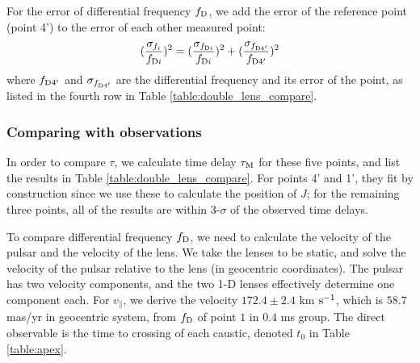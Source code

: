 \documentclass[useAMS,usenatbib]{mn2e}
\begin{document}
For the error of differential frequency $f_{\rm D}$, we add the error of the reference point (point 4') to the error of each other measured point:
\begin{equation}
\begin{aligned}
(\frac{\sigma_{f_i}}{f_{{\rm D}i}})^2=(\frac{\sigma_{f_{{\rm D}i}}}{f_{{\rm D}i}})^2+(\frac{\sigma_{f_{{\rm D}4'}}}{f_{{\rm D}4'}})^2
\end{aligned}
\end{equation}
where $f_{{\rm D}4'}$ and $\sigma_{f_{{\rm D}4'}}$ are the differential frequency
and its error of the point, as listed in the fourth row in Table
\ref{table:double_lens_compare}.

\subsubsection{Comparing with observations}
In order to compare $\tau$, we calculate time delay $\tau_{\rm M}$ for these five
points, and list the results in Table
\ref{table:double_lens_compare}. For points 4' and 1', they fit by
construction since we use these to calculate the position of $J$; for the remaining three points, all of the results are within 3-$\sigma$ of the observed time delays.

To compare differential frequency $f_{\rm D}$, we need to calculate the velocity of the pulsar and the velocity of the lens. We take the lenses to be static, and solve the velocity of the pulsar relative to the lens (in geocentric coordinates). The pulsar has two velocity components, and the two 1-D lenses effectively determine one component each.
For $v_{\parallel}$, we derive the velocity $172.4 \pm 2.4$ km $\rm s^{-1}$, 
which is $58.7$ mas/yr in geocentric system, 
from $f_{\rm D}$ of point $1$ in $0.4$ ms group.  The direct observable is the time to crossing of each caustic, denoted $t_0$ in Table \ref{table:apex}. 
\end{document}
